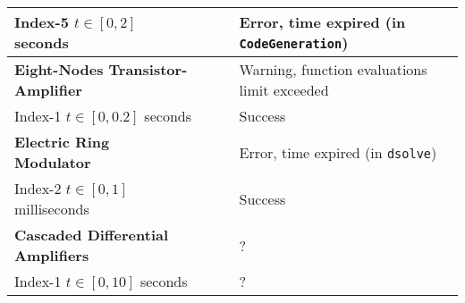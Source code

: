 {\begin{longtable}{lccl}
    Index-5 \quad $t \in [0, 2]$ seconds & \Indigo{} & \mycrossmark{}\phantom{\mywarnmark{}} & Error, time expired (in \texttt{CodeGeneration}) \\ \midrule
  \multirow{1}{*}{\textbf{Eight-Nodes Transistor-Amplifier~\cite{lioen1998test, mazzia2008test}}}
    & \Maple{}  & \mycheckmark{}\mywarnmark{} & Warning, function evaluations limit exceeded \\ \cmidrule(l{4pt}){2-4}
    Index-1 \quad $t \in [0, 0.2]$ seconds & \Indigo{} & \mycheckmark{}\phantom{\mywarnmark{}} & Success \\ \midrule
  \multirow{1}{*}{\textbf{Electric Ring Modulator~\cite{lioen1998test, mazzia2008test}}}
    & \Maple{}  & \mycrossmark{}\phantom{\mywarnmark{}} & Error, time expired (in \texttt{dsolve}) \\ \cmidrule(l{4pt}){2-4}
    Index-2 \quad $t \in [0, 1]$ milliseconds & \Indigo{} & \mycheckmark{}\phantom{\mywarnmark{}} & Success \\ \midrule
  \multirow{1}{*}{\textbf{Cascaded Differential Amplifiers~\cite{brenan1995numerical}}}
    & \Maple{}  & \mycheckmark{}\phantom{\mywarnmark{}} & ? \\ \cmidrule(l{4pt}){2-4}
    Index-1 \quad $t \in [0, 10]$ seconds & \Indigo{} & \mycheckmark{}\phantom{\mywarnmark{}} & ? \\
  \bottomrule
\end{longtable}}